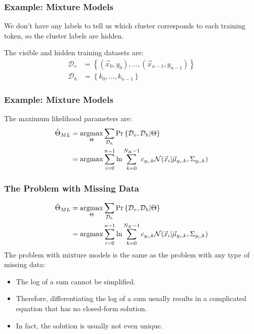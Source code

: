 \documentclass{beamer}
\newcommand{\argmax}{\operatornamewithlimits{argmax}}
\begin{document}
\begin{frame}
  \frametitle{Example: Mixture Models}

  We don't have any labels to tell us which cluster corresponds to each training token, so the
  cluster labels are hidden.
  
  The visible and hidden training  datasets are:
  \begin{align*}
    {\mathcal D}_v &= \left\{(\vec{x}_0,y_0),\ldots,(\vec{x}_{n-1},y_{n-1})\right\}\\
    {\mathcal D}_h &= \left\{k_0,\ldots,k_{n-1}\right\}
  \end{align*}
\end{frame}

\begin{frame}
  \frametitle{Example: Mixture Models}

  The maximum likelihood parameters are:
  \begin{align*}
    \hat\Theta_{ML}
    &= \argmax_\Theta\sum_{{\mathcal D}_h}\Pr\left\{{\mathcal D}_v,{\mathcal D}_h|\Theta\right\}\\
    &= \argmax\sum_{i=0}^{n-1}\ln
    \sum_{k=0}^{N_K-1}c_{y_i,k}{\mathcal N}(\vec{x}_i|\vec\mu_{y_i,k},\Sigma_{y_i,k})
  \end{align*}
\end{frame}

\begin{frame}
  \frametitle{The Problem with Missing Data}

  \begin{align*}
    \hat\Theta_{ML}
    &= \argmax_\Theta\sum_{{\mathcal D}_h}\Pr\left\{{\mathcal D}_v,{\mathcal D}_h|\Theta\right\}\\
    &= \argmax\sum_{i=0}^{n-1}\ln
    \sum_{k=0}^{N_K-1}c_{y_i,k}{\mathcal N}(\vec{x}_i|\vec\mu_{y_i,k},\Sigma_{y_i,k})
  \end{align*}
  The problem with mixture models is the same as the problem with any type of missing data:
  \begin{itemize}
  \item The log of a sum cannot be simplified.
  \item Therefore, differentiating the log of a sum usually results in
    a complicated equation that has no closed-form solution.
  \item In fact, the solution is usually not even unique.
  \end{itemize}
\end{frame}

\end{document}
